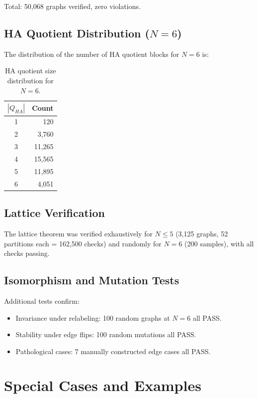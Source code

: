\documentclass[11pt, a4paper]{article}
\theoremstyle{definition}
\theoremstyle{remark}
\begin{document}
Total: 50,068 graphs verified, zero violations.

\subsection{HA Quotient Distribution (\(N=6\))}

The distribution of the number of HA quotient blocks for \(N=6\) is:

\begin{table}[h]
\centering
\begin{tabular}{c|r}
\toprule
\(|Q_{HA}|\) & Count \\
\midrule
1 & 120 \\
2 & 3,760 \\
3 & 11,265 \\
4 & 15,565 \\
5 & 11,895 \\
6 & 4,051 \\
\bottomrule
\end{tabular}
\caption{HA quotient size distribution for \(N=6\).}
\end{table}

\subsection{Lattice Verification}

The lattice theorem was verified exhaustively for \(N \le 5\) (3,125 graphs, 52 partitions each = 162,500 checks) and randomly for \(N=6\) (200 samples), with all checks passing.

\subsection{Isomorphism and Mutation Tests}

Additional tests confirm:
\begin{itemize}
\item Invariance under relabeling: 100 random graphs at \(N=6\) all PASS.
\item Stability under edge flips: 100 random mutations all PASS.
\item Pathological cases: 7 manually constructed edge cases all PASS.
\end{itemize}

\section{Special Cases and Examples}
\end{document}
